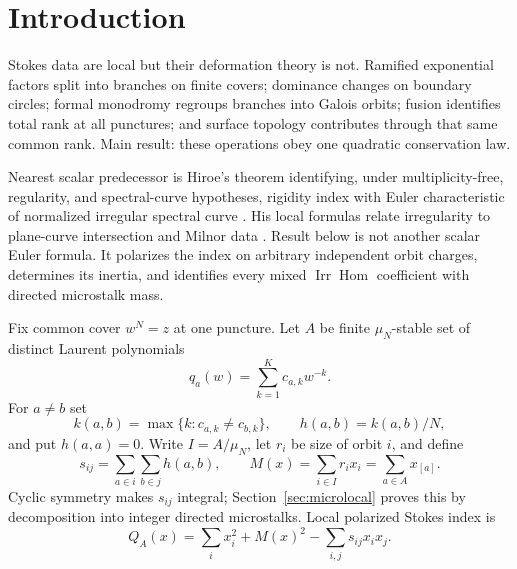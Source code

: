 \documentclass[11pt,a4paper]{amsart}
\theoremstyle{plain}
\theoremstyle{definition}
\begin{document}
\maketitle

\section{Introduction}

Stokes data are local but their deformation theory is not.  Ramified exponential factors split
into branches on finite covers; dominance changes on boundary circles; formal monodromy regroups
branches into Galois orbits; fusion identifies total rank at all punctures; and surface topology
contributes through that same common rank.  Main result: these operations obey one quadratic
conservation law.

Nearest scalar predecessor is Hiroe's theorem identifying, under multiplicity-free, regularity,
and spectral-curve hypotheses, rigidity index with Euler characteristic of normalized irregular
spectral curve \cite{Hiroe2019Rigidity}.  His local formulas relate irregularity to plane-curve
intersection and Milnor data \cite{Hiroe2017Ramified}.  Result below is not another scalar Euler
formula.  It polarizes the index on arbitrary independent orbit charges, determines its inertia,
and identifies every mixed $\operatorname{Irr}\!\operatorname{Hom}$ coefficient with directed
microstalk mass.

Fix common cover $w^N=z$ at one puncture.  Let $A$ be finite $\mu_N$-stable set of distinct
Laurent polynomials
\[
                       q_a(w)=\sum_{k=1}^{K}c_{a,k}w^{-k}.
\]
For $a\ne b$ set
\[
 k(a,b)=\max\{k:c_{a,k}\ne c_{b,k}\},\qquad h(a,b)=k(a,b)/N,
\]
and put $h(a,a)=0$.  Write $I=A/\mu_N$, let $r_i$ be size of orbit $i$, and define
\begin{equation}\label{eq:intro-mixed-irregularity}
 s_{ij}=\sum_{a\in i}\sum_{b\in j}h(a,b),\qquad
 M(x)=\sum_{i\in I}r_ix_i=\sum_{a\in A}x_{[a]}.
\end{equation}
Cyclic symmetry makes $s_{ij}$ integral; Section~\ref{sec:microlocal} proves this by decomposition
into integer directed microstalks.  Local polarized Stokes index is
\begin{equation}\label{eq:intro-local-index}
 Q_A(x)=\sum_i x_i^2+M(x)^2-\sum_{i,j}s_{ij}x_ix_j.
\end{equation}
\end{document}
